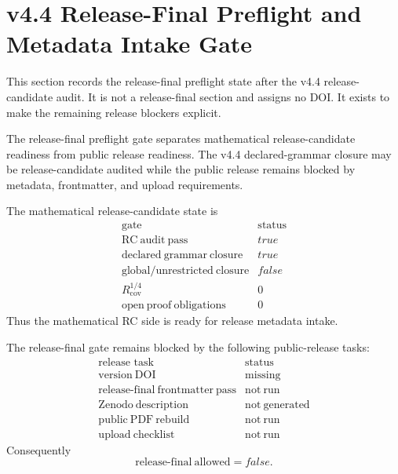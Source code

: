 
\section{v4.4 Release-Final Preflight and Metadata Intake Gate}
\label{sec:v45-release-final-preflight-metadata-intake}

This section records the release-final preflight state after the v4.4
release-candidate audit.  It is not a release-final section and assigns no
DOI.  It exists to make the remaining release blockers explicit.

\begin{definition}
The release-final preflight gate separates mathematical release-candidate
readiness from public release readiness.  The v4.4 declared-grammar closure
may be release-candidate audited while the public release remains blocked by
metadata, frontmatter, and upload requirements.
\end{definition}

\begin{proposition}
The mathematical release-candidate state is
\[
\begin{array}{c|c}
\text{gate} & \text{status}\\
\hline
\mathrm{RC\ audit\ pass} & true\\
\mathrm{declared\ grammar\ closure} & true\\
\mathrm{global/unrestricted\ closure} & false\\
R_{\mathrm{cov}}^{1/4} & 0\\
\mathrm{open\ proof\ obligations} & 0
\end{array}
\]
Thus the mathematical RC side is ready for release metadata intake.
\end{proposition}

\begin{proposition}
The release-final gate remains blocked by the following public-release tasks:
\[
\begin{array}{c|c}
\text{release task} & \text{status}\\
\hline
\mathrm{version\ DOI} & \mathrm{missing}\\
\mathrm{release\text{-}final\ frontmatter\ pass} & \mathrm{not\ run}\\
\mathrm{Zenodo\ description} & \mathrm{not\ generated}\\
\mathrm{public\ PDF\ rebuild} & \mathrm{not\ run}\\
\mathrm{upload\ checklist} & \mathrm{not\ run}
\end{array}
\]
Consequently
\[
    \mathrm{release\text{-}final\ allowed}=false.
\]
\end{proposition}

